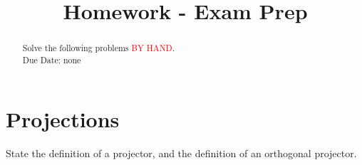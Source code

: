 \documentclass{ximera}
\begin{document}
    \title{Homework - Exam Prep}
    
    \begin{abstract} Solve the following problems \textcolor{red}{BY HAND}.
    \\
    Due Date: none
    \end{abstract}
    \maketitle

\section{Projections}

\begin{exercise}
    State the definition of a projector, and the definition of an orthogonal projector.
\end{exercise}

\end{document}
